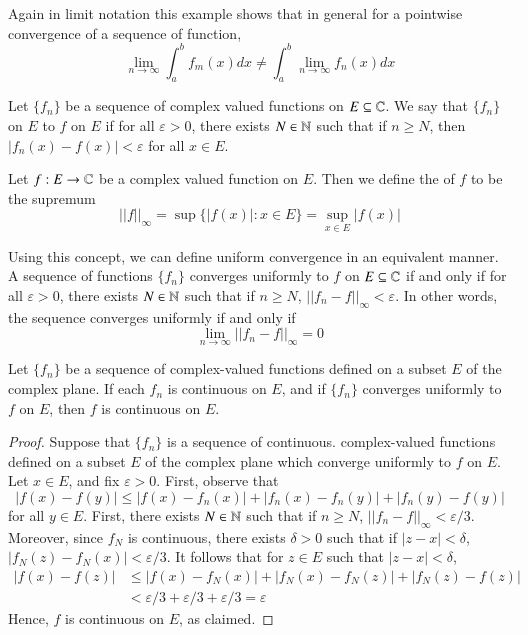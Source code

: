 \documentclass[12pt, a4paper, oneside, openright, titlepage]{book}
\begin{document}
Again in limit notation this example shows that in general for a pointwise convergence of a sequence of function, $$\lim\limits_{n\rightarrow \infty}\int_a^bf_m(x)dx \neq \int_a^b\lim\limits_{n\rightarrow \infty}f_n(x)dx$$

\begin{defn}
    Let $\{f_n\}$ be a sequence of complex valued functions on $E \subseteq \mathbb C$. We say that $\{f_n\}$  on $E$ to $f$ on $E$ if for all $\varepsilon > 0$, there exists $N \in \mathbb N$ such that if $n \geq N$, then $|f_n(x) - f(x)| < \varepsilon$ for all $x \in E$.
\end{defn}

\begin{defn}
    Let $f:E\rightarrow \mathbb C$ be a complex valued function on $E$. Then we define the  of $f$ to be the supremum \begin{equation*}
        ||f||_{\infty} = \sup\{|f(x)|:x \in E\} = \sup\limits_{x \in E}|f(x)|
    \end{equation*}
\end{defn}

Using this concept, we can define uniform convergence in an equivalent manner. A sequence of functions $\{f_n\}$ converges uniformly to $f$ on $E \subseteq \mathbb C$ if and only if for all $\varepsilon > 0$, there exists $N \in \mathbb N$ such that if $n \geq N$, $||f_n - f||_{\infty} < \varepsilon$. In other words, the sequence converges uniformly if and only if $$\lim\limits_{n\rightarrow \infty}||f_n-f||_{\infty} = 0$$

\begin{thm}
    Let $\{f_n\}$ be a sequence of complex-valued functions defined on a subset $E$ of the complex plane. If each $f_n$ is continuous on $E$, and if $\{f_n\}$ converges uniformly to $f$ on $E$, then $f$ is continuous on $E$.
\end{thm}
\begin{proof}
    Suppose that $\{f_n\}$ is a sequence of continuous. complex-valued functions defined on a subset $E$ of the complex plane which converge uniformly to $f$ on $E$. Let $x \in E$, and fix $\varepsilon > 0$. First, observe that \begin{equation*}
        |f(x)-f(y)| \leq |f(x)-f_n(x)|+|f_n(x)-f_n(y)|+|f_n(y)-f(y)|
    \end{equation*}
    for all $y \in E$. First, there exists $N \in \mathbb N$ such that if $n \geq N$, $||f_n - f||_{\infty} < \varepsilon/3$. Moreover, since $f_N$ is continuous, there exists $\delta > 0$ such that if $|z - x| < \delta$, $|f_N(z) - f_N(x)| < \varepsilon/3$. It follows that for $z \in E$ such that $|z - x| < \delta$, \begin{align*}
        |f(x) - f(z)| &\leq |f(x) - f_N(x)| + |f_N(x)-f_N(z)| + |f_N(z) - f(z)| \\
        &< \varepsilon/3 + \varepsilon/3 + \varepsilon/3 = \varepsilon
    \end{align*}
    Hence, $f$ is continuous on $E$, as claimed.
\end{proof}
\end{document}
